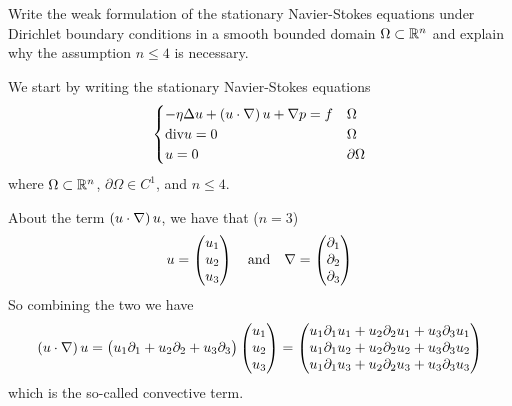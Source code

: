 \newpage
\begin{exercise}
    Write the weak formulation of the stationary Navier-Stokes equations under Dirichlet boundary conditions in a smooth bounded domain \(\Omega \subset \mathbb{R}^n\) and explain why the assumption \(n \leq 4\) is necessary.
\end{exercise}
We start by writing the stationary Navier-Stokes equations
\[
    \begin{cases}
        - \eta \Delta u + \left( u \cdot \nabla \right) u + \nabla p = f & \Omega \\
        \text{div} u = 0 & \Omega \\
        u = 0 & \partial\Omega
    \end{cases}
\]
where \(\Omega \subset \mathbb{R}^n\), \(\partial\Omega \in C^1\), and \(n \leq 4\).
\begin{remark}
    About the term \(\left( u \cdot \nabla \right) u\), we have that (\(n = 3\))
    \[
        u = \begin{pmatrix}
            u_1 \\
            u_2 \\
            u_3
        \end{pmatrix} \quad \text{and} \quad \nabla = \begin{pmatrix}
            \partial_1 \\
            \partial_2 \\
            \partial_3
        \end{pmatrix}
    \]
    So combining the two we have
    \[
        \begin{split}
            \left( u \cdot \nabla \right) u = \begin{pmatrix}
                u_1 \partial_1 + u_2 \partial_2 + u_3 \partial_3
            \end{pmatrix} \begin{pmatrix}
                u_1 \\
                u_2 \\
                u_3
            \end{pmatrix} = \begin{pmatrix}
                u_1 \partial_1 u_1 + u_2 \partial_2 u_1 + u_3 \partial_3 u_1 \\
                u_1 \partial_1 u_2 + u_2 \partial_2
                u_2 + u_3 \partial_3 u_2 \\
                u_1 \partial_1 u_3 + u_2 \partial_2 u_3 + u_3 \partial_3 u_3
            \end{pmatrix}
        \end{split}
    \]
    which is the so-called convective term.
\end{remark}
